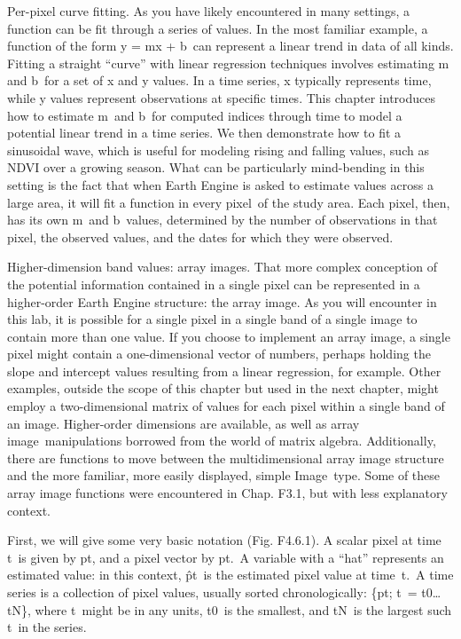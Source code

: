 \documentclass[
  letterpaper,
  DIV=11,
  numbers=noendperiod]{scrreprt}
\begin{document}
Per-pixel curve fitting. As you have likely encountered in many
settings, a function can be fit through a series of values. In the most
familiar example, a function of the form y = mx + b~can represent a
linear trend in data of all kinds. Fitting a straight ``curve'' with
linear regression techniques involves estimating m and b~for a set of x
and y values. In a time series, x typically represents time, while y
values represent observations at specific times. This chapter introduces
how to estimate m~and b~for computed indices through time to model a
potential linear trend in a time series. We then demonstrate how to fit
a sinusoidal wave, which is useful for modeling rising and falling
values, such as NDVI over a growing season. What can be particularly
mind-bending in this setting is the fact that when Earth Engine is asked
to estimate values across a large area, it will fit a function in every
pixel~of the study area. Each pixel, then, has its own m~and b~values,
determined by the number of observations in that pixel, the observed
values, and the dates for which they were observed.

Higher-dimension band values: array images. That more complex conception
of the potential information contained in a single pixel can be
represented in a higher-order Earth Engine structure: the array image.
As you will encounter in this lab, it is possible for a single pixel in
a single band of a single image to contain more than one value. If you
choose to implement an array image, a single pixel might contain a
one-dimensional vector of numbers, perhaps holding the slope and
intercept values resulting from a linear regression, for example. Other
examples, outside the scope of this chapter but used in the next
chapter, might employ a two-dimensional matrix of values for each pixel
within a single band of an image. Higher-order dimensions are available,
as well as array image~manipulations borrowed from the world of matrix
algebra. Additionally, there are functions to move between the
multidimensional array image structure and the more familiar, more
easily displayed, simple Image~type. Some of these array image functions
were encountered in Chap. F3.1, but with less explanatory context.

First, we will give some very basic notation (Fig. F4.6.1). A scalar
pixel at time t~is given by pt, and a pixel vector by pt.~A variable
with a ``hat'' represents an estimated value: in this context, p̂t~is the
estimated pixel value at time~t.~A time series is a collection of pixel
values, usually sorted chronologically: \{pt; t~= t0\ldots tN\}, where
t~might be in any units, t0~is the smallest, and tN~is the largest such
t~in the series.
\end{document}
